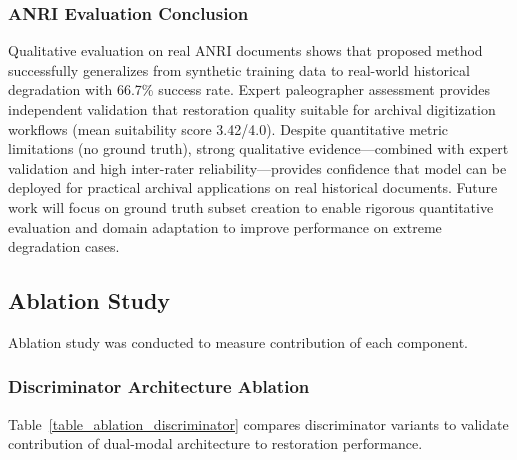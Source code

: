 \documentclass[journal]{IEEEtran}
\begin{document}
\subsubsection{ANRI Evaluation Conclusion}
Qualitative evaluation on real ANRI documents shows that proposed method successfully generalizes from synthetic training data to real-world historical degradation with 66.7\% success rate. Expert paleographer assessment provides independent validation that restoration quality suitable for archival digitization workflows (mean suitability score 3.42/4.0). Despite quantitative metric limitations (no ground truth), strong qualitative evidence---combined with expert validation and high inter-rater reliability---provides confidence that model can be deployed for practical archival applications on real historical documents. Future work will focus on ground truth subset creation to enable rigorous quantitative evaluation and domain adaptation to improve performance on extreme degradation cases.

\subsection{Ablation Study}

Ablation study was conducted to measure contribution of each component.

\subsubsection{Discriminator Architecture Ablation}

Table~\ref{table_ablation_discriminator} compares discriminator variants to validate contribution of dual-modal architecture to restoration performance.
\end{document}
